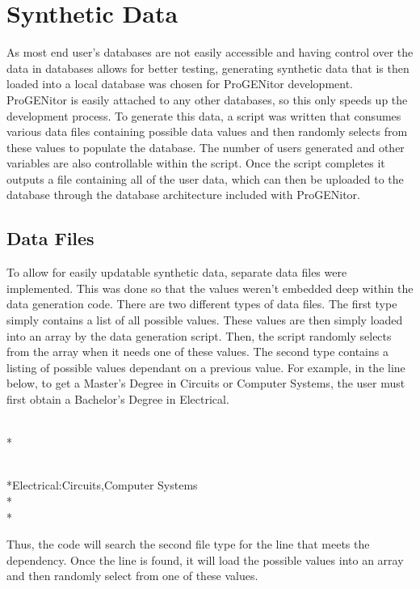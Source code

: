 \section{Synthetic Data}
\label{sect:mock-data}
As most end user's databases are not easily accessible and having control over
the data in databases allows for better testing, generating synthetic data that
is then loaded into a local database was chosen for ProGENitor development. 
ProGENitor is easily attached to any other databases, so this only speeds up the
development process.  To generate this data, a script was written that
consumes various data files containing possible data values and then randomly
selects from these values to populate the database.  The number of users
generated and other variables are also controllable within the script.  Once the
script completes it outputs a file containing all of the user data, which can
then be uploaded to the database through the database architecture included with
ProGENitor.

\subsection{Data Files}
To allow for easily updatable synthetic data, separate data files were
implemented.  This was done so that the values weren't embedded deep within the
data generation code.  There are two different types of data files.  The first type simply contains a list
of all possible values.  These values are then simply loaded into an array by
the data generation script.  Then, the script randomly selects from the
array when it needs one of these values.  The second type contains a listing of
possible values dependant on a previous value.  For example, in the line below,
to get a Master's Degree in Circuits or Computer Systems, the user must first
obtain a Bachelor's Degree in Electrical.
\begin{footnotesize}
\\*\begin{tt}
\\*Electrical:Circuits,Computer Systems\\*
\\*\end{tt}
\end{footnotesize}
Thus, the code will search the second file type for the line that meets the
dependency.  Once the line is found, it will load the possible values into an
array and then randomly select from one of these values.

